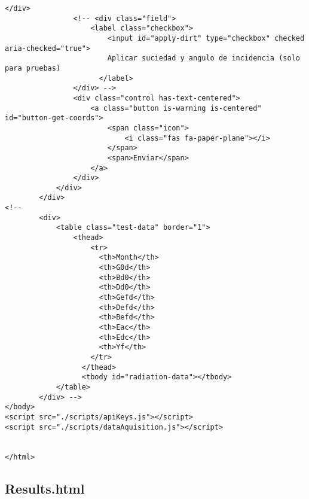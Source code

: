\begin{lstlisting}[style=ES6, caption={public/index.html}]
                </div>
                <!-- <div class="field">
                    <label class="checkbox">
                        <input id="apply-dirt" type="checkbox" checked aria-checked="true">
                        Aplicar suciedad y angulo de incidencia (solo para pruebas)
                      </label>
                </div> -->
                <div class="control has-text-centered">
                    <a class="button is-warning is-centered" id="button-get-coords">
                        <span class="icon">
                            <i class="fas fa-paper-plane"></i>
                        </span>
                        <span>Enviar</span>
                    </a>
                </div>
            </div>
        </div>
<!--         
        <div>
            <table class="test-data" border="1">
                <thead>
                    <tr>
                      <th>Month</th>
                      <th>G0d</th>
                      <th>Bd0</th>
                      <th>Dd0</th>
                      <th>Gefd</th>
                      <th>Defd</th>
                      <th>Befd</th>
                      <th>Eac</th>
                      <th>Edc</th>
                      <th>Yf</th>
                    </tr>
                  </thead>
                  <tbody id="radiation-data"></tbody>
            </table>
        </div> -->
</body>
<script src="./scripts/apiKeys.js"></script>
<script src="./scripts/dataAquisition.js"></script>


</html>

\end{lstlisting}

\subsection{Results.html}

